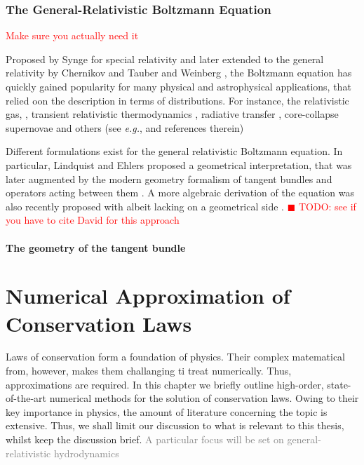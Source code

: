\documentclass[11pt,a4paper,headinclude=true,DIV=14,BCOR=8mm,chapterprefix,listof=totoc,twoside,openright,abstracton]{scrbook}
\newcommand{\todo}[1]{\textcolor{red}{$\blacksquare$ TODO: #1}}
\newcommand{\red}[1]{\textcolor{red}{#1}}
\newcommand{\gray}[1]{\textcolor{gray}{#1}}
\begin{document}

\subsection{The General-Relativistic Boltzmann Equation}
\red{Make sure you actually need it}

Proposed by Synge \cite{Synge:1957} for special relativity and later extended to the general relativity by Chernikov \cite{Chernikov:1962} and Tauber and Weinberg \cite{Tauber:1961}, the Boltzmann equation has quickly gained popularity for many physical and astrophysical applications, that relied oon the description in terms of distributions. For instance, the relativistic gas, \cite{Israel:1963}, transient relativistic thermodynamics \cite{Israel:1979wp}, radiative transfer \cite{Lindquist:1966}, core-collapse supernovae \cite{Bruenn:1985} and others (see \textit{e.g.}, \cite{Cercignani:2002} and references therein)

Different formulations exist for the general relativistic Boltzmann equation. In particular, Lindquist \cite{Lindquist:1966} and Ehlers \cite{Ehlers:1971} proposed a geometrical interpretation, that was later augmented by the modern geometry formalism of tangent bundles and operators acting between them \cite{Sasaki:1958,Sasaki:1962}. A more algebraic derivation of the equation was also recently proposed with albeit lacking on a geometrical side \cite{Debbasch:2009a,Debbasch:2009b}. 
\todo{see if you have to cite David for this approach}

\subsubsection{The geometry of the tangent bundle}



\chapter{Numerical Approximation of Conservation Laws}
\label{ch:theory:grhd_num_methods}

Laws of conservation form a foundation of physics. Their complex matematical from, however, makes them challanging ti treat numerically. Thus, approximations are required. In this chapter we briefly outline high-order, state-of-the-art numerical methods for the solution of conservation laws. Owing to their key importance in physics, the amount of literature concerning the topic is extensive. Thus, we shall limit our discussion to what is relevant to this thesis, whilst keep the discussion brief. \gray{A particular focus will be set on general-relativistic hydrodynamics} \\
\end{document}
